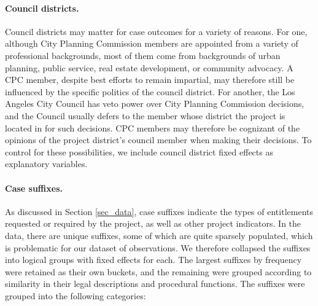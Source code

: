 \paragraph{Council districts.} Council districts may matter for case outcomes for a variety of reasons. For one, although City Planning Commission members are appointed from a variety of professional backgrounds, most of them come from backgrounds of urban planning, public service, real estate development, or community advocacy. A CPC member, despite best efforts to remain impartial, may therefore still be influenced by the specific politics of the council district. For another, the Los Angeles City Council has veto power over City Planning Commission decisions, and the Council usually defers to the member whose district the project is located in for such decisions. CPC members may therefore be cognizant of the opinions of the project district's council member when making their decisions. To control for these possibilities, we include council district fixed effects as explanatory variables.

\paragraph{Case suffixes.} As discussed in Section \ref{sec_data}, case suffixes indicate the types of entitlements requested or required by the project, as well as other project indicators. In the data, there are  unique suffixes, some of which are quite sparsely populated, which is problematic for our dataset of  observations. We therefore collapsed the suffixes into  logical groups with fixed effects for each. The largest suffixes by frequency were retained as their own buckets, and the remaining were grouped according to similarity in their legal descriptions and procedural functions. The suffixes were grouped into the following categories:










